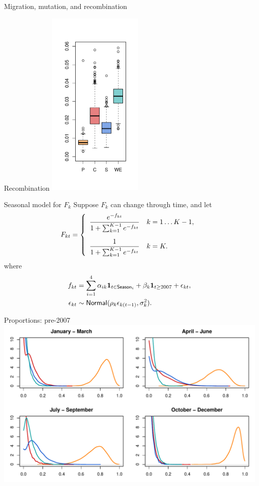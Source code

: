 \documentclass[]{beamer}
\begin{document}
\begin{frame}{Migration, mutation, and recombination}
\begin{minipage}{0.2\linewidth}
Recombination
\includegraphics[width=1.8in, trim=70 30 -70 40]{Pictures/island/recombination.pdf}
\end{minipage}
\end{frame}

\begin{frame}{Seasonal model for $F_k$}
Suppose $F_k$ can change through time, and let
\[
F_{kt} = \left\{\begin{array}{ll}\displaystyle\frac{e^{-f_{kt}}}{1 + \sum_{k=1}^{K-1} e^{-f_{kt}}} & k=1\ldots K-1,
\vspace{10pt}\\
\displaystyle\frac{1}{1 + \sum_{k=1}^{K-1} e^{-f_{kt}}}& k=K.\end{array}\right.
\]
where
\begin{align*}
f_{kt} &= \sum_{i=1}^4 \alpha_{ik} {\bf 1}_{t \in \mathsf{Season}_i} + \beta_k {\bf 1}_{t \geq 2007} +\epsilon_{kt},\\
\epsilon_{kt} & \sim \mathsf{Normal}(\rho_k \epsilon_{k(t-1)}, \sigma^2_{k}).
\end{align*}
\vspace{-30pt}
\end{frame}

\begin{frame}{Proportions: pre-2007}
\includegraphics[width=\textwidth, trim=40 0 40 0]{Pictures/island/seasonal_props1.pdf}
\end{frame}
\end{document}
